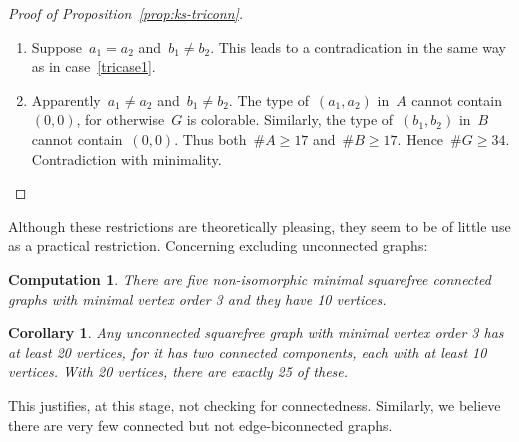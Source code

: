 \documentclass[adraft,copyright,creativecommons]{eptcs}
\newcounter{main}
\newtheorem{comp}[main]{Computation}
\newtheorem{cor}[main]{Corollary}
\theoremstyle{definition}
\theoremstyle{remark}
\begin{document}
\begin{proof}[Proof of Proposition~\ref{prop:ks-triconn}]
\begin{enumerate}
\begin{enumerate}
            Thus the type of~$(a_1,a_2)$ in~$A$ cannot contain~$(0,0)$.
            Thus, by Computation~\ref{comp:types}, $\#A \geq 17$.
            Consequently~$\#G \geq 34$. Contradiction with minimality.

            \item
            Apparently~$b_1=b_2$ has fixed color~$0$ in~$B$.
            Hence, by Computation~\ref{comp:types}, $\#B \geq 15$.

            Suppose~$a_1$ is not adjacent to~$a_2$.
            Then any coloring of~$A$ can be extended with a coloring
            of~$B$ to a coloring of~$G$. Contradiction.
            
            Apparently~$a_1$ is adjacent to~$a_2$.

            The type of~$(a_1,a_2)$ in~$A$ cannot contain~$(1,0)$
            or~$(0,1)$ for otherwise~$G$ can be colored.
            It also cannot contain~$(1,1)$ as~$a_1$ and~$a_2$
            are adjacent.
            Thus both~$a_1$ and~$a_2$ have fixed color~$0$ in~$A$.
            Hence~$\#A\geq 17$ by Computation~\ref{comp:types}.
            Consequently~$\#G \geq 32$. Contradiction
            with minimality.
        \end{enumerate}
    \item Suppose~$a_1 = a_2$ and~$b_1 \neq b_2$.
            This leads to a contradication in the same way
            as in case~\ref{tricase1}.
    \item Apparently~$a_1 \neq a_2$ and~$b_1 \neq b_2$.
        The type of~$(a_1,a_2)$ in~$A$ cannot contain~$(0,0)$,
        for otherwise~$G$ is colorable.
        Similarly, the type of~$(b_1,b_2)$ in~$B$ cannot contain~$(0,0)$.
        Thus both~$\#A \geq 17$ and~$\#B \geq 17$.
        Hence~$\#G \geq 34$. Contradiction with minimality. \qedhere
    \end{enumerate}
\end{proof}

Although these restrictions are theoretically pleasing,
they seem to be of little use as a practical restriction.
Concerning excluding unconnected graphs:
\begin{comp}
    There are five non-isomorphic minimal
    squarefree connected graphs
    with minimal vertex order 3 and they have 10 vertices.
\end{comp}
\begin{cor}
    Any unconnected
    squarefree graph with minimal vertex order 3
    has at least 20 vertices, for it has two connected components,
    each with at least 10 vertices.
    With 20 vertices, there are exactly 25 of these.
\end{cor}
This justifies, at this stage, not checking for connectedness.
Similarly, we believe there are very few connected but not
edge-biconnected graphs.
\end{document}
